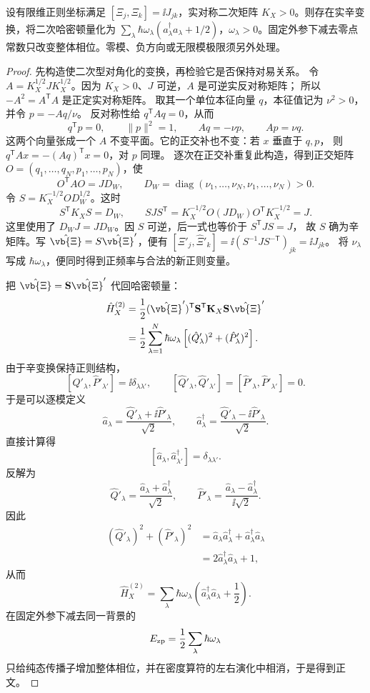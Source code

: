 \begin{theorem}[正定二次哈密顿量的辛正常形]
设有限维正则坐标满足 $[\Xi_j,\Xi_k]=\ii J_{jk}$，实对称二次矩阵 $K_X>0$。则存在实辛变换，将二次哈密顿量化为 $\sum_\lambda\hbar\omega_\lambda(a_\lambda^\dagger a_\lambda+1/2)$，$\omega_\lambda>0$。固定外参下减去零点常数只改变整体相位。零模、负方向或无限模极限须另外处理。
\end{theorem}
\begin{proof}
先构造使二次型对角化的变换，再检验它是否保持对易关系。
令 $A=K_X^{1/2}JK_X^{1/2}$。因为 $K_X>0$、$J$ 可逆，$A$ 是可逆实反对称矩阵；
所以 $-A^2=A^{\mathsf T}A$ 是正定实对称矩阵。
取其一个单位本征向量 $q$，本征值记为 $\nu^2>0$，并令 $p=-Aq/\nu$。
反对称性给 $q^{\mathsf T}Aq=0$，从而
\[
q^{\mathsf T}p=0,\qquad \|p\|^2=1,\qquad Aq=-\nu p,\qquad Ap=\nu q.
\]
这两个向量张成一个 $A$ 不变平面。它的正交补也不变：若 $x$ 垂直于 $q,p$，
则 $q^{\mathsf T}Ax=-(Aq)^{\mathsf T}x=0$，对 $p$ 同理。
逐次在正交补重复此构造，得到正交矩阵 $O=(q_1,\ldots,q_N,p_1,\ldots,p_N)$，使
\[
O^{\mathsf T}AO=JD_W,\qquad
D_W=\operatorname{diag}(\nu_1,\ldots,\nu_N,\nu_1,\ldots,\nu_N)>0.
\]
令 $S=K_X^{-1/2}OD_W^{1/2}$。这时
\[
S^{\mathsf T}K_XS=D_W,\qquad
SJS^{\mathsf T}=K_X^{-1/2}O(JD_W)O^{\mathsf T}K_X^{-1/2}=J.
\]
这里使用了 $D_WJ=JD_W$。因 $S$ 可逆，后一式也等价于 $S^{\mathsf T}JS=J$，
故 $S$ 确为辛矩阵。写 $\hat{\vb{\Xi}}=S\hat{\vb{\Xi}}'$，便有
$[\hat\Xi'_j,\hat\Xi'_k]=\ii(S^{-1}JS^{-\mathsf T})_{jk}=\ii J_{jk}$。
将 $\nu_\lambda$ 写成 $\hbar\omega_\lambda$，便同时得到正频率与合法的新正则变量。

把 $\hat{\vb{\Xi}}=\mathbf S\hat{\vb{\Xi}}'$ 代回哈密顿量：
\begin{align*}
\hat H_X^{(2)}
&=
\frac12
(\hat{\vb{\Xi}}')^{\mathsf T}
\mathbf S^{\mathsf T}\mathbf K_X\mathbf S
\hat{\vb{\Xi}}'\\
&=
\frac12
\sum_{\lambda=1}^{N}
\hbar\omega_\lambda
\left[
(\hat Q'_\lambda)^2+(\hat P'_\lambda)^2
\right].
\end{align*}
由于辛变换保持正则结构，
\[
[\hat Q'_\lambda,\hat P'_{\lambda'}]
=
\ii\delta_{\lambda\lambda'},
\qquad
[\hat Q'_\lambda,\hat Q'_{\lambda'}]
=
[\hat P'_\lambda,\hat P'_{\lambda'}]
=
0.
\]
于是可以逐模定义
\[
\hat a_\lambda
=
\frac{\hat Q'_\lambda+\ii\hat P'_\lambda}{\sqrt2},
\qquad
\hat a_\lambda^\dagger
=
\frac{\hat Q'_\lambda-\ii\hat P'_\lambda}{\sqrt2}.
\]
直接计算得
\[
[\hat a_\lambda,\hat a_{\lambda'}^\dagger]
=
\delta_{\lambda\lambda'}.
\]
反解为
\[
\hat Q'_\lambda
=
\frac{\hat a_\lambda+\hat a_\lambda^\dagger}{\sqrt2},
\qquad
\hat P'_\lambda
=
\frac{\hat a_\lambda-\hat a_\lambda^\dagger}{\ii\sqrt2}.
\]
因此
\begin{align*}
(\hat Q'_\lambda)^2+(\hat P'_\lambda)^2
&=
\hat a_\lambda\hat a_\lambda^\dagger
+
\hat a_\lambda^\dagger\hat a_\lambda\\
&=
2\hat a_\lambda^\dagger\hat a_\lambda+1,
\end{align*}
从而
\[
\hat H_X^{(2)}
=
\sum_\lambda
\hbar\omega_\lambda
\left(
\hat a_\lambda^\dagger\hat a_\lambda+\frac12
\right).
\]
在固定外参下减去同一背景的
\[
E_{\rm zp}
=
\frac12\sum_\lambda\hbar\omega_\lambda
\]
只给纯态传播子增加整体相位，并在密度算符的左右演化中相消，于是得到正文。


\end{proof}
